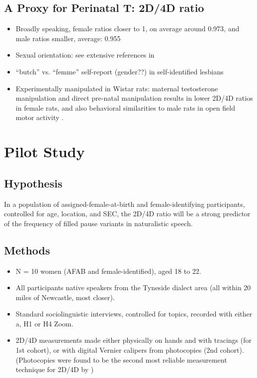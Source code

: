 \documentclass[a0,portrait]{a0poster}
\begin{document}
\begin{multicols}{2}
\subsection{A Proxy for Perinatal T: 2D/4D ratio}


\begin{itemize}
	\item Broadly speaking, female ratios closer to 1, on average around 0.973, and male ratios smaller, average: 0.955 \citep[][107]{balthazart2011}
	\item Sexual orientation: see extensive references in \citet{balthazart2011}
	\item ``butch'' vs. ``femme'' self-report (gender??) in self-identified lesbians \citep{brownetal2002}
	\item Experimentally manipulated in Wistar rats: maternal testosterone manipulation and direct pre-natal manipulation results in lower 2D/4D ratios in female rats, and also behavioral similarities to male rats in open field motor activity \citep{talarovicovaetal2009}.
\end{itemize}


\section*{Pilot Study}

\subsection{Hypothesis}

In a population of assigned-female-at-birth and female-identifying participants, controlled for age, location, and SEC, the 2D/4D ratio will be a strong predictor of the frequency of filled pause variants in naturalistic speech.

\subsection{Methods}
\begin{itemize}
	\item N = 10 women (AFAB and female-identified), aged 18 to 22.
	\item All participants native speakers from the Tyneside dialect area (all within 20 miles of Newcastle, most closer).
	\item Standard sociolinguistic interviews, controlled for topics, recorded with either a, H1 or H4 Zoom.
	\item 2D/4D measurements made either physically on hands and with tracings (for 1st cohort), or with digital Vernier calipers from photocopies (2nd cohort). (Photocopies were found to be the second most reliable measurement technique for 2D/4D by \citealt{allawayetal2009})
\end{itemize}



\end{multicols}
\end{document}
